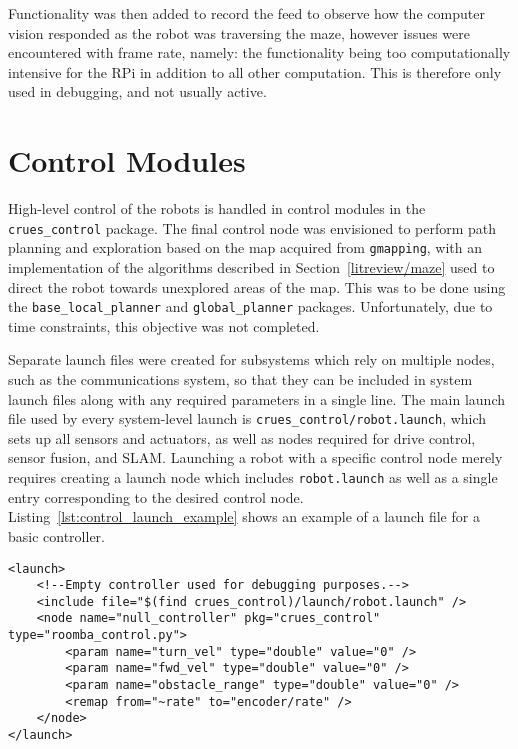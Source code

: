 Functionality was then added to record the feed to observe how the computer vision responded as
the robot was traversing the maze, however issues were encountered with frame rate, namely:
the functionality being too computationally intensive for the RPi in addition to all other
computation. This is therefore only used in debugging, and not usually active.

\section{Control Modules}\label{soft/control}

High-level control of the robots is handled in control modules in the
\verb|crues_control| package. The final control node was envisioned to perform
path planning and exploration based on the map acquired from \verb|gmapping|, with an
implementation of the algorithms described in Section~\ref{litreview/maze} used
to direct the robot towards unexplored areas of the map. This was to be done
using the \verb|base_local_planner| and \verb|global_planner| packages.
Unfortunately, due to time constraints, this objective was not completed.

Separate launch files were created for subsystems which rely on multiple nodes,
such as the communications system, so that they can be included in system launch
files along with any required parameters in a single line. The main launch file
used by every system-level launch is \verb|crues_control/robot.launch|, which
sets up all sensors and actuators, as well as nodes required for drive control,
sensor fusion, and SLAM. Launching a robot with a specific control node
merely requires creating a launch node which includes \verb|robot.launch| as
well as a single entry corresponding to the desired control node.
Listing~\ref{lst:control_launch_example} shows an example of a launch file for
a basic controller.

\begin{lstlisting}[caption={Launch file for null controller}, label={lst:control_launch_example}, style=xml]
<launch>
    <!--Empty controller used for debugging purposes.-->
    <include file="$(find crues_control)/launch/robot.launch" />
    <node name="null_controller" pkg="crues_control" type="roomba_control.py">
        <param name="turn_vel" type="double" value="0" />
        <param name="fwd_vel" type="double" value="0" />
        <param name="obstacle_range" type="double" value="0" />
        <remap from="~rate" to="encoder/rate" />
    </node>
</launch>
\end{lstlisting}


